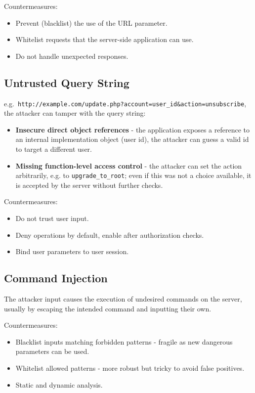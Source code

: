 \documentclass[11pt]{article}
\begin{document}
Countermeasures:
\begin{itemize}
  \item Prevent (blacklist) the use of the URL parameter.
  \item Whitelist requests that the server-side application can use.
  \item Do not handle unexpected responses.
\end{itemize}

\subsection{Untrusted Query String}
e.g.\ \texttt{http://example.com/update.php?account=user\_id\&action=unsubscribe}, the attacker can tamper with the query string:
\begin{itemize}
  \item \textbf{Insecure direct object references} - the application exposes a reference to an internal implementation object (user id), the attacker can guess a valid id to target a different user.
  \item \textbf{Missing function-level access control} - the attacker can set the action arbitrarily, e.g. to \texttt{upgrade\_to\_root}; even if this was not a choice available, it is accepted by the server without further checks.
\end{itemize}

Countermeasures:
\begin{itemize}
  \item Do not trust user input.
  \item Deny operations by default, enable after authorization checks.
  \item Bind user parameters to user session.
\end{itemize}

\subsection{Command Injection}
The attacker input causes the execution of undesired commands on the server, usually by escaping the intended command and inputting their own.

Countermeasures:
\begin{itemize}
  \item Blacklist inputs matching forbidden patterns - fragile as new dangerous parameters can be used.
  \item Whitelist allowed patterns - more robust but tricky to avoid false positives.
  \item Static and dynamic analysis.
\end{itemize}
\end{document}
